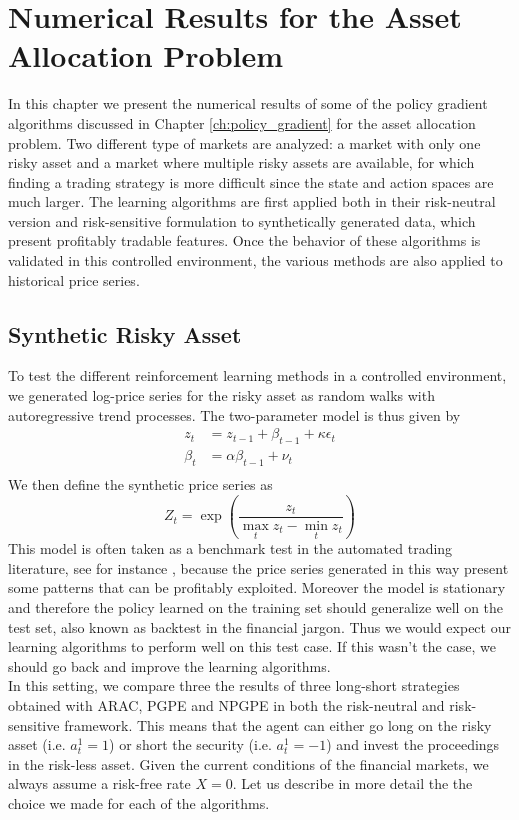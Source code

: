 \chapter{Numerical Results for the Asset Allocation Problem}

In this chapter we present the numerical results of some of the policy gradient algorithms discussed in Chapter \ref{ch:policy_gradient} for the asset allocation problem. Two different type of markets are analyzed: a market with only one risky asset and a market where multiple risky assets are available, for which finding a trading strategy is more difficult since the state and action spaces are much larger. The learning algorithms are first applied both in their risk-neutral version and risk-sensitive formulation to synthetically generated data, which present profitably tradable features. Once the behavior of these algorithms is validated in this controlled environment, the various methods are also applied to historical price series. 

\section{Synthetic Risky Asset}
To test the different reinforcement learning methods in a controlled environment, we generated log-price series for the risky asset as random walks with autoregressive trend processes. The two-parameter model is thus given by
\begin{equation*}
	\begin{split}
		z_t &= z_{t-1} + \beta_{t-1} + \kappa \epsilon_t\\
		\beta_t &= \alpha \beta_{t-1} + \nu_t\\
	\end{split}
\end{equation*}
We then define the synthetic price series as
\begin{equation*}
	Z_t = \exp\left(\frac{z_t}{\max_t z_t - \min_t z_t}\right)
\end{equation*}
This model is often taken as a benchmark test in the automated trading literature, see for instance \cite{moody1998performance}, because the price series generated in this way present some patterns that can be profitably exploited. Moreover the model is stationary and therefore the policy learned on the training set should generalize well on the test set, also known as backtest in the financial jargon. Thus we would expect our learning algorithms to perform well on this test case. If this wasn't the case, we should go back and improve the learning algorithms.\\
In this setting, we compare three the results of three long-short strategies obtained with ARAC, PGPE and NPGPE in both the risk-neutral and risk-sensitive framework. This means that the agent can either go long on the risky asset (i.e. $a_t^1 = 1$) or short the security (i.e. $a_t^1 = -1$) and invest the proceedings in the risk-less asset. Given the current conditions of the financial markets, we always assume a risk-free rate $X = 0$. Let us describe in more detail the the choice we made for each of the algorithms. 

